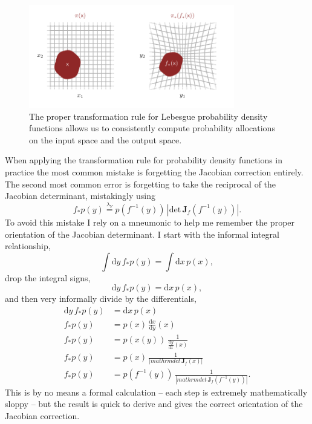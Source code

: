 \documentclass[
  letterpaper,
  DIV=11,
  numbers=noendperiod]{scrartcl}
\begin{document}
\begin{figure}

{\centering \includegraphics[width=0.8\textwidth,height=\textheight]{figures/integration_consistency/integration_consistency.pdf}

}

\caption{\label{fig-integration-consistency}The proper transformation
rule for Lebesgue probability density functions allows us to
consistently compute probability allocations on the input space and the
output space.}

\end{figure}

When applying the transformation rule for probability density functions
in practice the most common mistake is forgetting the Jacobian
correction entirely. The second most common error is forgetting to take
the reciprocal of the Jacobian determinant, mistakingly using \[
f_{*} p(y)
\overset{\lambda_{Y}}{=}
p(f^{-1}(y)) \, | \mathrm{det} \, \mathbf{J}_{f}(f^{-1}(y)) |.
\] To avoid this mistake I rely on a mneumonic to help me remember the
proper orientation of the Jacobian determinant. I start with the
informal integral relationship, \[
\int \mathrm{d} y \, f_{*} p(y) = \int \mathrm{d} x \, p(x),
\] drop the integral signs, \[
\mathrm{d} y \, f_{*} p(y) = \mathrm{d} x \, p(x),
\] and then very informally divide by the differentials, \begin{align*}
\mathrm{d} y \, f_{*} p(y) &= \mathrm{d} x \, p(x)
\\
f_{*} p(y)
&=
p(x) \, \frac{ \mathrm{d} x }{ \mathrm{d} y } (x)
\\
f_{*} p(y)
&=
p(x(y)) \, \frac{1}{ \frac{ \mathrm{d} y }{ \mathrm{d} x }(x) }
\\
f_{*} p(y)
&=
p(x) \, \frac{1}{ | mathrm{det} \, \mathbf{J}_{f}(x) |}
\\
f_{*} p(y)
&=
p(f^{-1}(y)) \, \frac{1}{ | mathrm{det} \, \mathbf{J}_{f}(f^{-1}(y)) |}.
\end{align*} This is by no means a formal calculation -- each step is
extremely mathematically sloppy -- but the result is quick to derive and
gives the correct orientation of the Jacobian correction.
\end{document}
